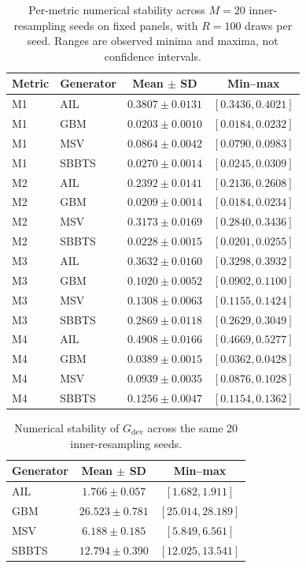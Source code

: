 \begin{table}[htbp]
\centering
\color{red}
\caption{Per-metric numerical stability across $M=20$ inner-resampling seeds on fixed panels, with $R=100$ draws per seed. Ranges are observed minima and maxima, not confidence intervals.}
\label{tab:mc-stability}
\small
\begin{tabular}{@{}llcc@{}}
\toprule
Metric & Generator & Mean $\pm$ SD & Min--max \\
\midrule
M1 & AIL & $0.3807 \pm 0.0131$ & $[0.3436, 0.4021]$ \\
M1 & GBM & $0.0203 \pm 0.0010$ & $[0.0184, 0.0232]$ \\
M1 & MSV & $0.0864 \pm 0.0042$ & $[0.0790, 0.0983]$ \\
M1 & SBBTS & $0.0270 \pm 0.0014$ & $[0.0245, 0.0309]$ \\
\addlinespace
M2 & AIL & $0.2392 \pm 0.0141$ & $[0.2136, 0.2608]$ \\
M2 & GBM & $0.0209 \pm 0.0014$ & $[0.0184, 0.0234]$ \\
M2 & MSV & $0.3173 \pm 0.0169$ & $[0.2840, 0.3436]$ \\
M2 & SBBTS & $0.0228 \pm 0.0015$ & $[0.0201, 0.0255]$ \\
\addlinespace
M3 & AIL & $0.3632 \pm 0.0160$ & $[0.3298, 0.3932]$ \\
M3 & GBM & $0.1020 \pm 0.0052$ & $[0.0902, 0.1100]$ \\
M3 & MSV & $0.1308 \pm 0.0063$ & $[0.1155, 0.1424]$ \\
M3 & SBBTS & $0.2869 \pm 0.0118$ & $[0.2629, 0.3049]$ \\
\addlinespace
M4 & AIL & $0.4908 \pm 0.0166$ & $[0.4669, 0.5277]$ \\
M4 & GBM & $0.0389 \pm 0.0015$ & $[0.0362, 0.0428]$ \\
M4 & MSV & $0.0939 \pm 0.0035$ & $[0.0876, 0.1028]$ \\
M4 & SBBTS & $0.1256 \pm 0.0047$ & $[0.1154, 0.1362]$ \\
\bottomrule
\end{tabular}
\end{table}

\begin{table}[htbp]
\centering
\color{red}
\caption{Numerical stability of $G_{\mathrm{dev}}$ across the same 20 inner-resampling seeds.}
\label{tab:mc-aggregate}
\small
\begin{tabular}{@{}lcc@{}}
\toprule
Generator & Mean $\pm$ SD & Min--max \\
\midrule
AIL & $1.766 \pm 0.057$ & $[1.682, 1.911]$ \\
GBM & $26.523 \pm 0.781$ & $[25.014, 28.189]$ \\
MSV & $6.188 \pm 0.185$ & $[5.849, 6.561]$ \\
SBBTS & $12.794 \pm 0.390$ & $[12.025, 13.541]$ \\
\bottomrule
\end{tabular}
\end{table}

\clearpage

